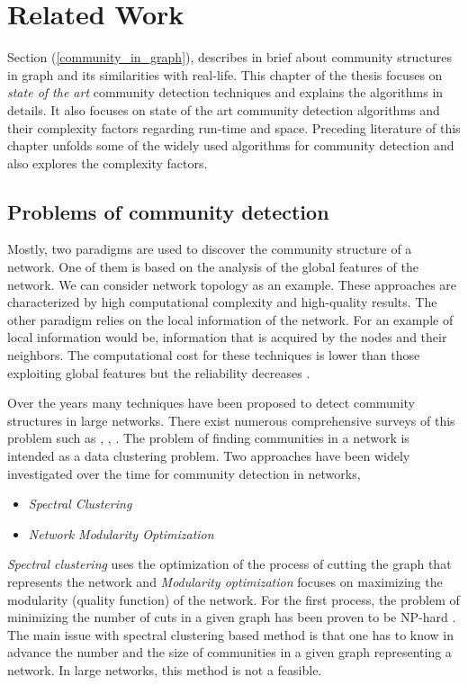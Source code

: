 \chapter{Related Work}\label{cha:2_relatedwork}
Section (\ref{community_in_graph}), describes in brief about community structures in graph and its similarities with real-life. This chapter of the thesis focuses on \textit{state of the art} community detection techniques and explains the algorithms in details. It also focuses on state of the art community detection algorithms and their complexity factors regarding run-time and space. Preceding literature of this chapter unfolds some of the widely used algorithms for community detection and also explores the complexity factors.

\section{Problems of community detection}
Mostly, two paradigms are used to discover the community structure of a network. One of them is based on the analysis of the global features of the network. We can consider network topology as an example. These approaches are characterized by high computational complexity and high-quality results. The other paradigm relies on the local information of the network. For an example of local information would be, information that is acquired by the nodes and their neighbors. The computational cost for these techniques is lower than those exploiting global features but the reliability decreases \cite{ref-28}.

Over the years many techniques have been proposed to detect community structures in large networks. There exist numerous comprehensive surveys of this problem such as \cite{ref-2}, \cite{ref-6}, \cite{ref-9}. The problem of finding communities in a network is intended as a data clustering problem. Two approaches have been widely investigated over the time for community detection in networks,
\begin{itemize}
	\item \textit{Spectral Clustering}
	\item \textit{Network Modularity Optimization} 
\end{itemize}
\textit{Spectral clustering} uses the optimization of the process of cutting the graph that represents the network and \textit{Modularity optimization} focuses on maximizing the modularity (quality function) of the network. For the first process, the problem of minimizing the number of cuts in a given graph has been proven to be NP-hard \cite{ref-29}. The main issue with spectral clustering based method is that one has to know in advance the number and the size of communities in a given graph representing a network. In large networks, this method is not a feasible.

